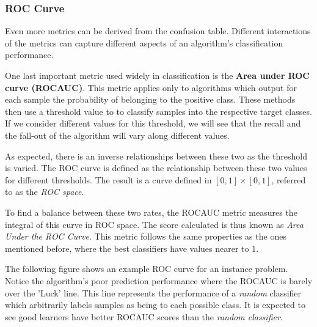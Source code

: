 \subsubsection{ROC Curve}

Even more metrics can be derived from the confusion table. Different interactions of the metrics can capture different aspects of an algorithm's classification performance.

One last important metric used widely in classification is the  \textbf{Area under ROC curve (ROCAUC)}. This metric applies only to algorithms which output for each sample  the probability of belonging to the positive class.  These methods then use a threshold value to to classify samples into the respective target classes. If we consider different values for this threshold, we will see that the recall and the fall-out of the algorithm will vary along different values.

As expected, there is an inverse relationships between these two as the threshold is varied. The ROC curve is defined as the relationship between these two values for different thresholds. The result is a curve defined in $[0,1]\times[0,1]$, referred to as the \textit{ROC space}.

To find a balance between these two rates, the ROCAUC metric measures the integral of this curve in ROC space. The score  calculated is thus known as \textit{Area Under the ROC Curve}. This metric follows the same properties as the ones mentioned before, where the best classifiers have values nearer to $1$.

The following figure shows an example ROC curve for an instance problem. Notice the algorithm's poor prediction performance where the ROCAUC is barely over the 'Luck' line. This line represents the performance of a \textit{random} classifier which arbitrarily labels samples as being to each possible class. It is expected to see good learners have better ROCAUC scores than the \textit{random classifier}.

